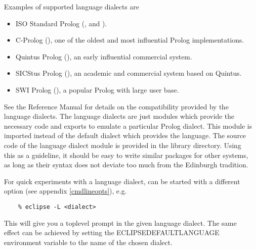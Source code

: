 Examples of supported language dialects are
\begin{itemize}
\item ISO Standard Prolog
    (,
     and
    ).
\item C-Prolog (), one
    of the oldest and most influential Prolog implementations.
\item Quintus Prolog (),
    an early influential commercial system.
\item SICStus Prolog (),
    an academic and commercial system based on Quintus.
\item SWI Prolog (),
    a popular Prolog with large user base. 
\end{itemize}
See the Reference Manual for details on the compatibility provided by the
language dialects.
The language dialects are just modules which provide the necessary code
and exports  to emulate a particular Prolog dialect. This module is imported
instead of the default  dialect which provides the
{\eclipse} language.
The source code of the language dialect module is provided in the
{\eclipse} library directory.
Using this as a guideline, it should be easy to write similar packages for
other systems, as long as their syntax does not deviate too much
from the Edinburgh tradition.

For quick experiments with a language dialect, {\eclipse} can be started
with a different  option
(see appendix \ref{cmdlineopts}), e.g.
\begin{verbatim}
    % eclipse -L <dialect>
\end{verbatim}
This will give you a toplevel prompt in the given language dialect.
The same effect can be achieved by setting the ECLIPSEDEFAULTLANGUAGE
environment variable to the name of the chosen dialect.


